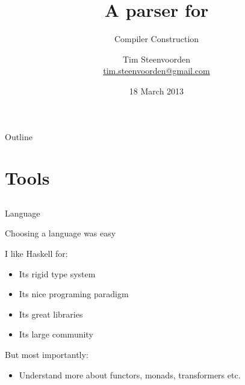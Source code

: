 

  {\lstset{language=haskell}}
  {}



\subtitle {Compiler Construction}
\title    {A parser for \SPL}
\author   [Tim Steenvoorden]
          {Tim Steenvoorden\\
           \medskip
           {\small \url{tim.steenvoorden@gmail.com}}}%
\date     {18 March 2013}

\begin{frame}
  \titlepage
\end{frame}

\begin{frame}{Outline}
  \tableofcontents
\end{frame}

\section{Tools}
\subsection*{}

\begin{frame}{Language}
  
  Choosing a language was easy
  
  I like Haskell for:

  \begin{itemize}
    \item Its rigid type system
    \item Its nice programing paradigm
    \item Its great libraries
    \item Its large community
  \end{itemize}

  But most importantly:

  \begin{itemize}
    \item Understand more about functors, monads, transformers etc.
  \end{itemize}

\end{frame}

